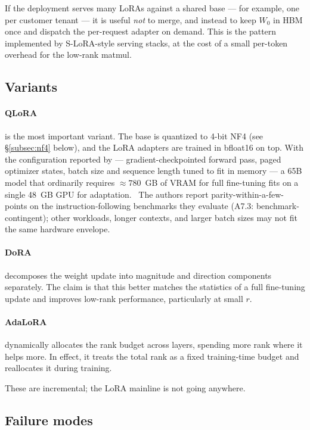 If the deployment serves many LoRAs against a shared base --- for
example, one per customer tenant --- it is useful \emph{not} to
merge, and instead to keep $W_0$ in HBM once and dispatch the
per-request adapter on demand. This is the pattern implemented by
S-LoRA-style serving stacks, at the cost of a small per-token overhead
for the low-rank matmul.

\subsection{Variants}

\paragraph{QLoRA} \citep{dettmers2023qlora} is the most important
variant. The base is quantized to 4-bit NF4 (see \S\ref{subsec:nf4}
below), and the LoRA adapters are trained in bfloat16 on top. With
the configuration reported by \citet{dettmers2023qlora} ---
gradient-checkpointed forward pass, paged optimizer states, batch
size and sequence length tuned to fit in memory --- a 65B model
that ordinarily requires $\approx 780$~GB of VRAM for full
fine-tuning fits on a single 48~GB GPU for adaptation. \Emp\ The
authors report parity-within-a-few-points on the
instruction-following benchmarks they evaluate (A7.3:
benchmark-contingent); other workloads, longer contexts, and
larger batch sizes may not fit the same hardware envelope.

\paragraph{DoRA} \citep{liu2024dora} decomposes the weight update into
magnitude and direction components separately. The claim is that this
better matches the statistics of a full fine-tuning update and
improves low-rank performance, particularly at small $r$.

\paragraph{AdaLoRA} \citep{zhang2023adalora} dynamically allocates
the rank budget across layers, spending more rank where it helps
more. In effect, it treats the total rank as a fixed training-time
budget and reallocates it during training.

These are incremental; the LoRA mainline is not going anywhere.

\subsection{Failure modes}

